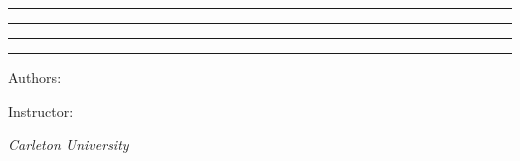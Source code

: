 
 
\begin{titlepage} %
	\centering %
	\vspace*{6\baselineskip} %
    
	\rule{\textwidth}{1.6pt}\vspace*{-\baselineskip}\vspace*{2pt} %
	\rule{\textwidth}{0.4pt} %
	\vspace{1.5\baselineskip} %

	{\DocTitle} %

	\vspace{1.5\baselineskip} %
	\rule{\textwidth}{0.4pt}\vspace*{-\baselineskip}\vspace{3.2pt} %
	\rule{\textwidth}{1.6pt} %

	\vspace{2\baselineskip} %
	{\large \DocSubTitle} %
	\vspace*{10\baselineskip} %
	
	Authors:

	\vspace{0.5\baselineskip} %
	{\scshape\Large\DocAuthors} %
	\vspace{1.5\baselineskip} %

	Instructor:

	\vspace{0.5\baselineskip} %
	{\scshape\Large\DocInstructor}
	\vspace{0.5\baselineskip} %
	\textit{Carleton University} %

	\vfill
	{\large \DocDate}
\end{titlepage}